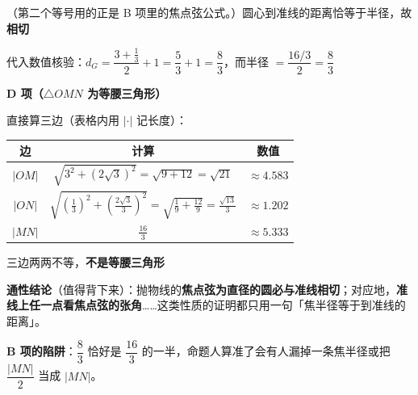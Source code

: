 \begin{answer}
（第二个等号用的正是 B 项里的焦点弦公式。）圆心到准线的距离恰等于半径，故\textbf{相切} 

代入数值核验：$d_G=\dfrac{3+\frac13}2+1=\dfrac{5}3+1=\dfrac83$，而半径 $=\dfrac{16/3}2=\dfrac83$ 

\par\medskip

\textbf{D 项（$\triangle OMN$ 为等腰三角形）}

直接算三边（表格内用 $\lvert\cdot\rvert$ 记长度）：

\begin{center}
\begin{tabular}{ccc}
\toprule
边 & 计算 & 数值 \\
\midrule
$\lvert OM\rvert$ & $\sqrt{3^{2}+\left(2\sqrt3\right)^{2}}=\sqrt{9+12}=\sqrt{21}$ & $\approx4.583$ \\
$\lvert ON\rvert$ & $\sqrt{\left(\frac13\right)^{2}+\left(\frac{2\sqrt3}3\right)^{2}}=\sqrt{\frac19+\frac{12}9}=\frac{\sqrt{13}}3$ & $\approx1.202$ \\
$\lvert MN\rvert$ & $\frac{16}3$ & $\approx5.333$ \\
\bottomrule
\end{tabular}
\end{center}

三边两两不等，\textbf{不是等腰三角形} 

\par\medskip

\begin{gktip}
\textbf{通性结论}（值得背下来）：抛物线的\textbf{焦点弦为直径的圆必与准线相切}；对应地，\textbf{准线上任一点看焦点弦的张角}……这类性质的证明都只用一句「焦半径等于到准线的距离」。

\textbf{B 项的陷阱}：$\dfrac83$ 恰好是 $\dfrac{16}3$ 的一半，命题人算准了会有人漏掉一条焦半径或把 $\dfrac{|MN|}2$ 当成 $|MN|$。
\end{gktip}


\par\medskip

\end{answer}
